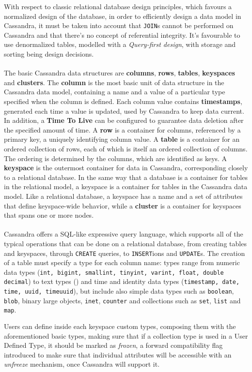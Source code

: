 With respect to classic relational database design principles, which favours a normalized design of the database, in order to efficiently design a data model in Cassandra, it must be taken into account that \texttt{JOIN}s cannot be performed on Cassandra and that there's no concept of referential integrity. It's favourable to use denormalized tables, modelled with a \textit{Query-first design}, with storage and sorting being design decisions.\\
\\
The basic Cassandra data structures are \textbf{columns}, \textbf{rows}, \textbf{tables}, \textbf{keyspaces} and \textbf{clusters}. The \textbf{column} is the most basic unit of data structure in the Cassandra data model, containing a name and a value of a particular type specified when the column is defined. Each column value contains \textbf{timestamps}, generated each time a value is updated, used by Cassandra to keep data current. In addition, a \textbf{Time To Live} can be configured to guarantee data deletion after the specified amount of time. A \textbf{row} is a container for columns, referenced by a primary key, a uniquely identifying column value. A \textbf{table} is a container for an ordered collection of rows, each of which is itself an ordered collection of columns. The ordering is determined by the columns, which are identified as keys. A \textbf{keyspace} is the outermost container for data in Cassandra, corresponding closely to a relational database. In the same way that a database is a container for tables in the relational model, a keyspace is a container for tables in the Cassandra data model. Like a relational database, a keyspace has a name and a set of attributes that define keyspace-wide behavior, while a \textbf{cluster} is a container for keyspaces that spans one or more nodes.\\
\\
Cassandra offers a SQL-like expressive query language, which supports all of the typical operations that can be done on a relational database, from creating tables and keyspaces, through \texttt{CREATE} queries, to \texttt{INSERT}ions and \texttt{UPDATE}s. The creation of a table must specify a type for each column name: types range from numeric data types (\texttt{int, bigint, smallint, tinyint, varint, float, double decimal}) to text types (\texttt{}) and time and identity data types (\texttt{timestamp, date, time, uuid, timeuuid}), but include also simple data types such as \texttt{boolean}, \texttt{blob}, binary large objects, \texttt{inet}, \texttt{counter} and collections such as \texttt{set}, \texttt{list} and \texttt{map}.

Users can define inside each keyspace custom types, composing them with the aforementioned basic types, making sure that if a collection type is used in a User Defined Type, it should be marked as \textit{frozen}, a forward compatibility flag introduced to make sure that individual attributes will be accessible with an \textit{unfreeze} mechanism, once Cassandra will support it.